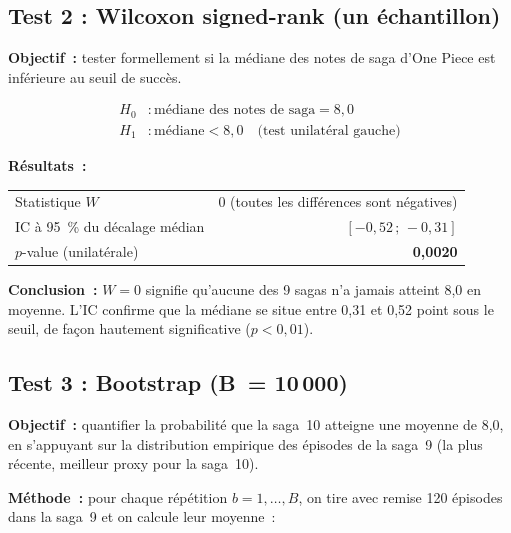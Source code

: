 \documentclass[a4paper,12pt,french]{article}
\begin{document}
\newpage



\subsection{Test 2 : Wilcoxon signed-rank (un échantillon)}

\textbf{Objectif~:} tester formellement si la médiane des notes de saga d'One
Piece est inférieure au seuil de succès.

\begin{align*}
  H_0 &: \text{médiane des notes de saga} = 8{,}0 \\
  H_1 &: \text{médiane} < 8{,}0 \quad \text{(test unilatéral gauche)}
\end{align*}

\medskip
\noindent\textbf{Résultats~:}
\begin{center}
\begin{tabular}{lr}
\toprule
Statistique $W$ & 0 (toutes les différences sont négatives) \\
IC à 95~\% du décalage médian & $[-0{,}52\,;\,-0{,}31]$ \\
$p$-value (unilatérale) & \textbf{0{,}0020} \\
\bottomrule
\end{tabular}
\end{center}

\textbf{Conclusion~:} $W = 0$ signifie qu'aucune des 9 sagas n'a jamais atteint
8{,}0 en moyenne. L'IC confirme que la médiane se situe entre 0{,}31 et
0{,}52 point sous le seuil, de façon hautement significative ($p < 0{,}01$).

\newpage

\subsection{Test 3 : Bootstrap (B~= 10\,000)}
\label{sec:bootstrap}

\textbf{Objectif~:} quantifier la probabilité que la saga~10 atteigne une moyenne
de 8{,}0, en s'appuyant sur la distribution empirique des épisodes de la saga~9
(la plus récente, meilleur proxy pour la saga~10).

\textbf{Méthode~:} pour chaque répétition $b = 1, \ldots, B$, on tire avec
remise 120 épisodes dans la saga~9 et on calcule leur moyenne~:
\end{document}
